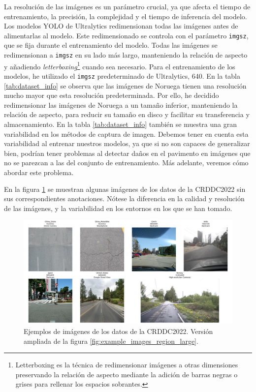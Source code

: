 La resolución de las imágenes es un parámetro crucial, ya que afecta el tiempo de entrenamiento, la precisión, la complejidad y el tiempo de inferencia del modelo. Los modelos YOLO de Ultralytics redimensionan todas las imágenes antes de alimentarlas al modelo. Este redimensionado se controla con el parámetro \texttt{imgsz}, que se fija durante el entrenamiento del modelo. Todas las imágenes se redimensionan a \texttt{imgsz} en su lado más largo, manteniendo la relación de aspecto y añadiendo \textit{letterboxing}\footnote{Letterboxing es la técnica de redimensionar imágenes a otras dimensiones preservando la relación de aspecto mediante la adición de barras negras o grises para rellenar los espacios sobrantes.} cuando sea necesario. Para el entrenamiento de los modelos, he utilizado el \texttt{imgsz} predeterminado de Ultralytics, 640. En la tabla \ref{tab:dataset_info} se observa que las imágenes de Noruega tienen una resolución mucho mayor que esta resolución predeterminada. Por ello, he decidido redimensionar las imágenes de Noruega a un tamaño inferior, manteniendo la relación de aspecto, para reducir su tamaño en disco y facilitar su transferencia y almacenamiento. En la tabla \ref{tab:dataset_info} también se muestra una gran variabilidad en los métodos de captura de imagen. Debemos tener en cuenta esta variabilidad al entrenar nuestros modelos, ya que si no son capaces de generalizar bien, podrían tener problemas al detectar daños en el pavimento en imágenes que no se parezcan a las del conjunto de entrenamiento. Más adelante, veremos cómo abordar este problema.

En la figura \ref{fig:example_images_region} se muestran algunas imágenes de los datos de la CRDDC2022 sin sus correspondientes anotaciones. Nótese la diferencia en la calidad y resolución de las imágenes, y la variabilidad en los entornos en los que se han tomado.

\begin{figure}[H]
    \centering
    \includegraphics[width=1\textwidth]{img/example_images_regions.png}
    \caption{Ejemplos de imágenes de los datos de la CRDDC2022. Versión ampliada de la figura \ref{fig:example_images_region_large}.}
    \label{fig:example_images_region}
\end{figure}


